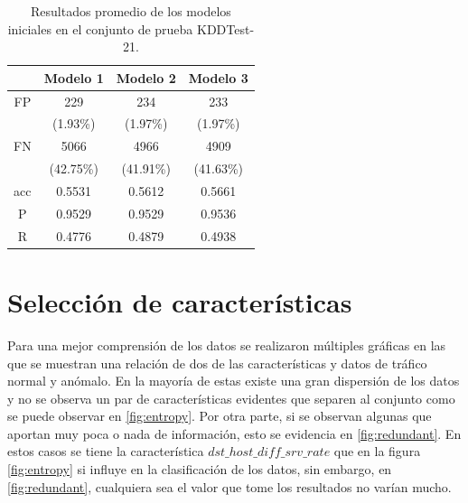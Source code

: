 \begin{table}[t]
    \begin{center}
        \label{tab:kddtest21_results}
        \begin{tabular}{c|c|c|c} %
        \textbf{} & \textbf{Modelo 1} & \textbf{Modelo 2} & \textbf{Modelo 3}\\
        \hline
        FP & 229 & 234 & 233\\
        &(1.93\%)&(1.97\%)&(1.97\%)\\
        FN & 5066 & 4966 & 4909\\
        &(42.75\%)&(41.91\%)&(41.63\%)\\
        acc & 0.5531 & 0.5612 & 0.5661\\
        P & 0.9529 & 0.9529 & 0.9536\\
        R & 0.4776 & 0.4879 & 0.4938\\
        \end{tabular}

        \caption{Resultados promedio de los modelos iniciales en el conjunto de prueba KDDTest-21.}
    \end{center}
\end{table}

\section{Selección de características}

Para una mejor comprensión de los datos se realizaron múltiples gráficas en las que se muestran una relación de dos de las características y datos de tráfico normal y anómalo. En la mayoría de estas existe una gran dispersión de los datos y no se observa un par de características evidentes que separen al conjunto como se puede observar en \ref{fig:entropy}. Por otra parte, si se observan algunas que aportan muy poca o nada de información, esto se evidencia en \ref{fig:redundant}. En estos casos se tiene la característica $dst\_host\_diff\_srv\_rate$ que en la figura \ref{fig:entropy} si influye en la clasificación de los datos, sin embargo, en \ref{fig:redundant}, cualquiera sea el valor que tome los resultados no varían mucho.

